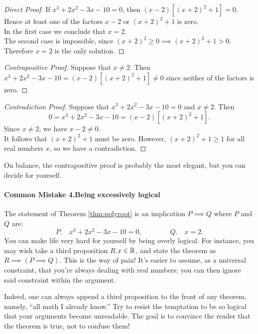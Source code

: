 \begin{proof}[Direct Proof]
If $x^3+2x^2-3x-10=0$, then $(x-2)[(x+2)^2+1]=0$. Hence at least one of the factors $x-2$ or $(x+2)^2+1$ is zero.\\
In the first case we conclude that $x=2$.\\
The second case is impossible, since $(x+2)^2\ge 0\implies (x+2)^2+1>0$.\\
Therefore $x=2$ is the only solution.
\end{proof}

\begin{proof}[Contrapositive Proof]
Suppose that $x\neq 2$. Then $x^3+2x^2-3x-10=(x-2)[(x+2)^2+1]\neq 0$ since neither of the factors is zero.
\end{proof}

\begin{proof}[Contradiction Proof]
Suppose that $x^3+2x^2-3x-10=0$ and $x\neq 2$. Then
\[0=x^3+2x^2-3x-10=(x-2)[(x+2)^2+1].\]
Since $x\neq 2$, we have $x-2\neq 0$.\\
It follows that $(x+2)^2+1$ must be zero. However, $(x+2)^2+1\ge 1$ for all real numbers $x$, so we have a contradiction.
\end{proof}

 On balance, the contrapositive proof is probably the most elegant, but you can decide for yourself.


\paragraph{Common Mistake 4.\quad Being excessively logical}

The statement of Theorem \ref{thm:polyroot} is an implication $P\implies Q$ where $P$ and $Q$ are:
\[P.\quad x^3+2x^2-3x-10=0, \qquad\qquad Q.\quad x=2.\]
You can make life very hard for yourself by being overly logical. For instance, you may wish take a third proposition $R$.\quad $x\in\mathbb{R}$, and state the theorem as $R\implies (P\implies Q)$. This is the way of pain! It's easier to assume, as a universal constraint, that you're always dealing with real numbers; you can then ignore said constraint within the argument.

 Indeed, one can always append a third proposition to the front of any theorem, namely, ``all math I already know.'' Try to resist the temptation to be so logical that your arguments become unreadable. The goal is to convince the reader that the theorem is true, not to confuse them!


